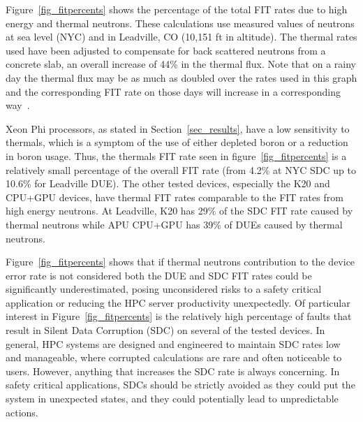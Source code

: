 

Figure~\ref{fig_fitpercents} shows the percentage of the total FIT rates due to high energy and thermal neutrons. These calculations use measured values of neutrons at sea level (NYC) and in Leadville, CO (10,151 ft in altitude). The thermal rates used have been adjusted to compensate for back scattered neutrons from a concrete slab, an overall increase of 44\% in the thermal flux. Note that on a rainy day the thermal flux may be as much as doubled over the rates used in this graph and the corresponding FIT rate on those days will increase in a corresponding way~\cite{ziegler2003}.

Xeon Phi processors, 
 as stated in Section~\ref{sec_results}, have a low sensitivity to thermals, which is a symptom of the use of either depleted boron or a reduction in boron usage. 
 Thus, the thermals FIT rate seen in figure~\ref{fig_fitpercents} is a relatively small percentage of the overall FIT rate (from 4.2\% at NYC SDC up to 10.6\% for Leadville DUE).
The other tested devices, especially the K20 and CPU+GPU devices, have thermal FIT rates comparable to the FIT rates from high energy neutrons. At Leadville, K20 has 29\% of the SDC FIT rate caused by thermal neutrons while APU CPU+GPU has 39\% of DUEs caused by thermal neutrons.



Figure~\ref{fig_fitpercents} shows that if thermal neutrons contribution to the device error rate is not considered both the DUE and SDC FIT rates could be significantly underestimated, posing unconsidered risks to a safety critical application or reducing the HPC server productivity unexpectedly. 
Of particular interest in Figure~\ref{fig_fitpercents} is the relatively high percentage of
faults that result in Silent Data Corruption (SDC) on several of the tested devices. In general, HPC systems are designed and engineered to maintain SDC rates low and manageable, where corrupted calculations are rare and often noticeable to users. However, anything that increases the SDC rate is always concerning. In safety critical applications, SDCs should be strictly avoided as they could put the system in unexpected states, and they could potentially lead to unpredictable actions.

